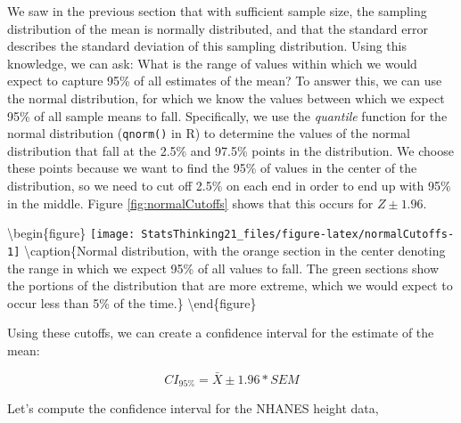 \documentclass[]{book}
\newenvironment{Shaded}{\begin{snugshade}}{\end{snugshade}}
\newcommand{\KeywordTok}[1]{\textcolor[rgb]{0.13,0.29,0.53}{\textbf{#1}}}
\newcommand{\DataTypeTok}[1]{\textcolor[rgb]{0.13,0.29,0.53}{#1}}
\newcommand{\DecValTok}[1]{\textcolor[rgb]{0.00,0.00,0.81}{#1}}
\newcommand{\FloatTok}[1]{\textcolor[rgb]{0.00,0.00,0.81}{#1}}
\newcommand{\StringTok}[1]{\textcolor[rgb]{0.31,0.60,0.02}{#1}}
\newcommand{\CommentTok}[1]{\textcolor[rgb]{0.56,0.35,0.01}{\textit{#1}}}
\newcommand{\OperatorTok}[1]{\textcolor[rgb]{0.81,0.36,0.00}{\textbf{#1}}}
\newcommand{\NormalTok}[1]{#1}
\theoremstyle{definition}
\theoremstyle{definition}
\theoremstyle{definition}
\theoremstyle{remark}
\begin{document}
We saw in the previous section that with sufficient sample size, the
sampling distribution of the mean is normally distributed, and that the
standard error describes the standard deviation of this sampling
distribution. Using this knowledge, we can ask: What is the range of
values within which we would expect to capture 95\% of all estimates of
the mean? To answer this, we can use the normal distribution, for which
we know the values between which we expect 95\% of all sample means to
fall. Specifically, we use the \emph{quantile} function for the normal
distribution (\texttt{qnorm()} in R) to determine the values of the
normal distribution that fall at the 2.5\% and 97.5\% points in the
distribution. We choose these points because we want to find the 95\% of
values in the center of the distribution, so we need to cut off 2.5\% on
each end in order to end up with 95\% in the middle. Figure
\ref{fig:normalCutoffs} shows that this occurs for \(Z \pm 1.96\).

\textbackslash{}begin\{figure\}
\texttt{[image: StatsThinking21\_files/figure-latex/normalCutoffs-1]}
\textbackslash{}caption\{Normal distribution, with the orange section in
the center denoting the range in which we expect 95\% of all values to
fall. The green sections show the portions of the distribution that are
more extreme, which we would expect to occur less than 5\% of the
time.\}\label{fig:normalCutoffs} \textbackslash{}end\{figure\}

Using these cutoffs, we can create a confidence interval for the
estimate of the mean:

\[
CI_{95\%} = \bar{X} \pm 1.96*SEM
\]

Let's compute the confidence interval for the NHANES height data,

\begin{Shaded}
\end{Shaded}
\end{document}
